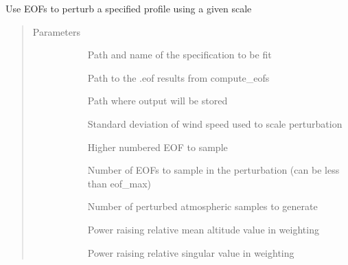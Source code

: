 \documentclass[letterpaper,10pt,english]{sphinxmanual}
\begin{document}
\begin{fulllineitems}
\label{\detokenize{stochprop.eofs:stochprop.eofs.perturb_atmo}}
Use EOFs to perturb a specified profile using a given scale
\begin{quote}\begin{description}
\item[{Parameters}] \leavevmode\begin{description}
\item[{}] \leavevmode
Path and name of the specification to be fit

\item[{}] \leavevmode
Path to the .eof results from compute\_eofs

\item[{}] \leavevmode
Path where output will be stored

\item[{}] \leavevmode
Standard deviation of wind speed used to scale perturbation

\item[{}] \leavevmode
Higher numbered EOF to sample

\item[{}] \leavevmode
Number of EOFs to sample in the perturbation (can be less than eof\_max)

\item[{}] \leavevmode
Number of perturbed atmospheric samples to generate

\item[{}] \leavevmode
Power raising relative mean altitude value in weighting

\item[{}] \leavevmode
Power raising relative singular value in weighting

\end{description}

\end{description}\end{quote}

\end{fulllineitems}
\end{document}
